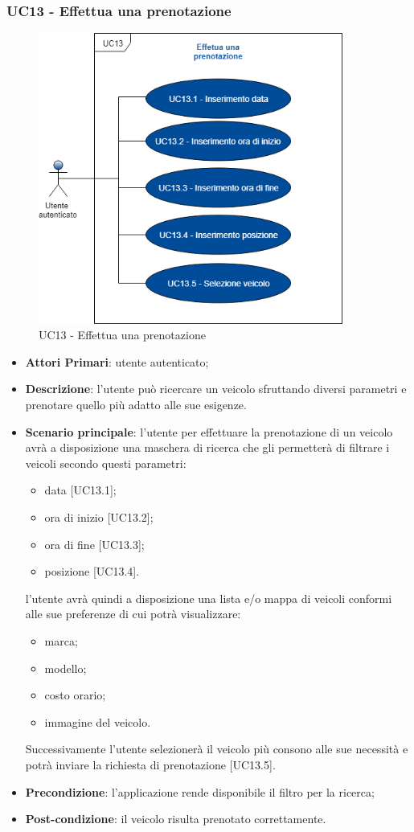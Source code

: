 \subsubsection{UC13 - Effettua una prenotazione}
\begin{figure}[h]
	\includegraphics[width=10cm]{res/images/UC13Effettuaprenotazione.png}
	\centering
	\caption{UC13 - Effettua una prenotazione}
\end{figure}
\begin{itemize}
	\item \textbf{Attori Primari}: utente autenticato;
	\item \textbf{Descrizione}: l'utente può ricercare un veicolo sfruttando diversi parametri e prenotare quello più adatto alle sue esigenze.
	\item \textbf{Scenario principale}: l'utente per effettuare la prenotazione di un veicolo avrà a disposizione una maschera di ricerca che gli permetterà di filtrare i veicoli secondo questi parametri:
	\begin{itemize}
		\item data [UC13.1];
		\item ora di inizio [UC13.2];
		\item ora di fine [UC13.3];
		\item posizione [UC13.4]. 
	\end{itemize}
	l'utente avrà quindi a disposizione una lista e/o mappa di veicoli conformi alle sue preferenze di cui potrà visualizzare:
	\begin{itemize}		
		\item marca;
		\item modello;
		\item costo orario;
		\item immagine del veicolo.
	\end{itemize}
	Successivamente l'utente selezionerà il veicolo più consono alle sue necessità e potrà inviare la richiesta di prenotazione [UC13.5].
	\item \textbf{Precondizione}: l'applicazione rende disponibile il filtro per la ricerca;
	\item \textbf{Post-condizione}: il veicolo risulta prenotato correttamente.
\end{itemize} 
